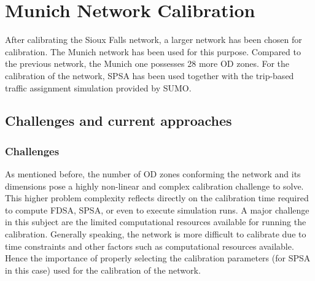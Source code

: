 
\chapter{Munich Network Calibration}\label{chapter:munich_network_calibration}
After calibrating the Sioux Falls network, a larger network has been chosen for calibration. The Munich network has been used for this purpose. Compared to the previous network, the Munich one possesses 28 more OD zones. For the calibration of the network, SPSA has been used together with the trip-based traffic assignment simulation provided by SUMO. 

\section{Challenges and current approaches}
\subsection{Challenges}
As mentioned before, the number of OD zones conforming the network and its dimensions pose a highly non-linear and complex calibration challenge to solve. This higher problem complexity reflects directly on the calibration time required to compute FDSA, SPSA, or even to execute simulation runs. A major challenge in this subject are the limited computational resources available for running the calibration. Generally speaking, the network is more difficult to calibrate due to time constraints and other factors such as computational resources available. Hence the importance of properly selecting the calibration parameters (for SPSA in this case) used for the calibration of the network. 

